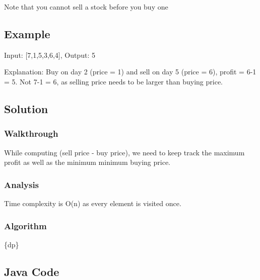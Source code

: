 \documentclass[]{book}
\begin{document}
Note that you cannot sell a stock before you buy one

\hypertarget{example-32}{%
\subsection{Example}\label{example-32}}

Input: {[}7,1,5,3,6,4{]}, Output: 5

Explanation: Buy on day 2 (price = 1) and sell on day 5 (price = 6), profit = 6-1 = 5. Not 7-1 = 6, as selling price
needs to be larger than buying price.

\hypertarget{solution-26}{%
\subsection{Solution}\label{solution-26}}

\hypertarget{walkthrough-32}{%
\subsubsection{Walkthrough}\label{walkthrough-32}}

While computing (sell price - buy price), we need to keep track the maximum profit as well as the minimum minimum
buying price.

\hypertarget{analysis-35}{%
\subsubsection{Analysis}\label{analysis-35}}

Time complexity is O(n) as every element is visited once.

\hypertarget{algorithm-35}{%
\subsubsection{Algorithm}\label{algorithm-35}}

\{dp\}

\hypertarget{java-code-29}{%
\subsection{Java Code}\label{java-code-29}}
\end{document}
